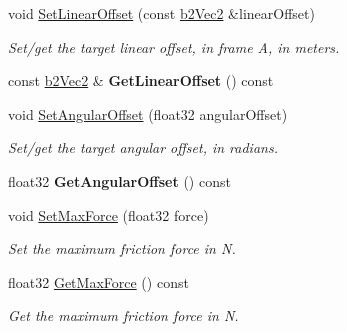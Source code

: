 \begin{DoxyCompactItemize}
void \hyperlink{classb2_motor_joint_a99254b5fc9ed9f2d0fdccada513000c3}{Set\+Linear\+Offset} (const \hyperlink{structb2_vec2}{b2\+Vec2} \&linear\+Offset)
\begin{DoxyCompactList}\small\item\em Set/get the target linear offset, in frame A, in meters. \end{DoxyCompactList}\item 
\mbox{\label{classb2_motor_joint_a87a61f162e202e2f3c12200e42e3b180}} 
const \hyperlink{structb2_vec2}{b2\+Vec2} \& {\bfseries Get\+Linear\+Offset} () const
\item 
\mbox{\label{classb2_motor_joint_a14d7dca1767548ddffe293e39cafc3c7}} 
void \hyperlink{classb2_motor_joint_a14d7dca1767548ddffe293e39cafc3c7}{Set\+Angular\+Offset} (float32 angular\+Offset)
\begin{DoxyCompactList}\small\item\em Set/get the target angular offset, in radians. \end{DoxyCompactList}\item 
\mbox{\label{classb2_motor_joint_a4dc4e5ee4ec8615c3d712ea6cac48436}} 
float32 {\bfseries Get\+Angular\+Offset} () const
\item 
\mbox{\label{classb2_motor_joint_a62f95f23d60123cebe14f2fcec155801}} 
void \hyperlink{classb2_motor_joint_a62f95f23d60123cebe14f2fcec155801}{Set\+Max\+Force} (float32 force)
\begin{DoxyCompactList}\small\item\em Set the maximum friction force in N. \end{DoxyCompactList}\item 
\mbox{\label{classb2_motor_joint_ac7353eace38d2593a523149abe8ec2b5}} 
float32 \hyperlink{classb2_motor_joint_ac7353eace38d2593a523149abe8ec2b5}{Get\+Max\+Force} () const
\begin{DoxyCompactList}\small\item\em Get the maximum friction force in N. \end{DoxyCompactList}\item 
\mbox{\label{classb2_motor_joint_a3e9a259d36c36e0dc078282e6799d625}} 

\end{DoxyCompactItemize}
